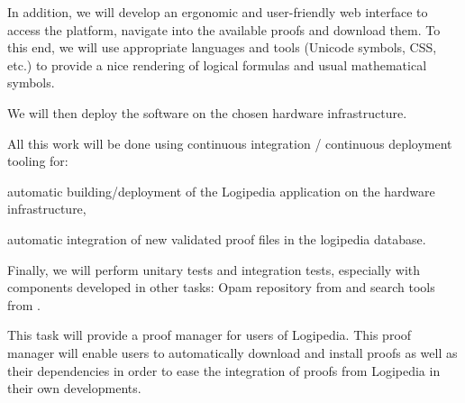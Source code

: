 \begin{workpackage}[id=access,type=RTD,wphases=1-48,
  short=Access,%
  title={Access},
  activity=tna,
  lead=Inr,InrRM=54,OcaRM=6]
\begin{tasklist}
\begin{task}[id=web,
      title=Giving access to the infrastructure on the Web,
      shorttitle=Web,
      lead=Inr,InrRM=12,wphases=7-18]
    In addition, we will develop an ergonomic and user-friendly web
    interface to access the platform, navigate into the available
    proofs and download them. To this end, we will use appropriate
    languages and tools (Unicode symbols, CSS, etc.) to provide a nice
    rendering of logical formulas and usual mathematical symbols.
    
    We will then deploy the software on the chosen hardware
    infrastructure.

    All this work will be done using continuous integration / continuous
    deployment tooling for:
    \begin{compactitem}
    \item automatic building/deployment of the Logipedia application
      on the hardware infrastructure,
    \item automatic integration of new validated proof files in the
      logipedia database.
    \end{compactitem}

    Finally, we will perform unitary tests and integration tests,
    especially with components developed in other tasks: Opam
    repository from  and search tools from
    .
  \end{task}

  \begin{task}[id=opam,
      title=Giving access to the infrastructure in proof systems,
      shorttitle=Syst.,
      lead=Oca,OcaRM=6,wphases=7-12]
    This task will provide a proof manager for users of Logipedia. This proof
    manager will enable users to automatically download and install
    proofs as well as their dependencies in order to ease the
    integration of proofs from Logipedia in their own developments.


\end{task}
\end{tasklist}
\end{workpackage}
